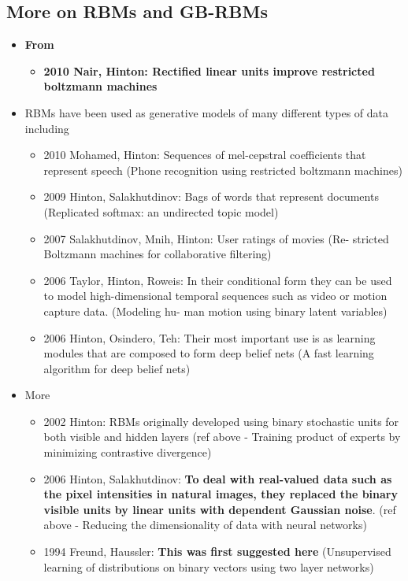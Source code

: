\documentclass[twoside,english]{uiofysmaster}
\begin{document}
\subsection{More on RBMs and GB-RBMs}

\begin{itemize}
	\item \textbf{From}
	\begin{itemize}
		\item \textbf{2010 Nair, Hinton: Rectified linear units improve restricted boltzmann machines} \cite{Nair2010}
	\end{itemize}
	\item RBMs have been used as generative models of many different types of data including
	\begin{itemize}
		\item 2010 Mohamed, Hinton: Sequences of mel-cepstral coefficients that represent speech (Phone recognition using restricted boltzmann machines)
		\item 2009 Hinton, Salakhutdinov: Bags of words that represent documents (Replicated softmax: an undirected topic model)
		\item 2007 Salakhutdinov, Mnih, Hinton: User ratings of movies (Re- stricted Boltzmann machines for collaborative filtering)
		\item 2006 Taylor, Hinton, Roweis: In their conditional form they can be used to model high-dimensional temporal sequences such as video or motion capture data. (Modeling hu- man motion using binary latent variables)
		\item 2006 Hinton, Osindero, Teh: Their most important use is as learning modules that are composed to form deep belief nets (A fast learning algorithm for deep belief nets)
	\end{itemize}
	\item More
	\begin{itemize}
		\item 2002 Hinton: RBMs originally developed using binary stochastic units for both visible and hidden layers (ref above - Training product of experts by minimizing contrastive divergence) \cite{Hinton2002}
		\item 2006 Hinton, Salakhutdinov: \textbf{To deal with real-valued data such as the pixel intensities in natural images, they replaced the binary visible units by linear units with dependent Gaussian noise}. (ref above - Reducing the dimensionality of data with neural networks) \cite{Hinton2006}
		\item 1994 Freund, Haussler: \textbf{This was first suggested here} (Unsupervised learning of distributions on binary vectors using two layer networks) \cite{Freund1992}

\end{itemize}
\end{itemize}
\end{document}
